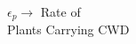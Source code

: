 \documentclass[preview]{standalone}
\begin{document}
\begin{center}
$\epsilon_p \rightarrow$ Rate of\\Plants Carrying CWD
\end{center}
\end{document}
